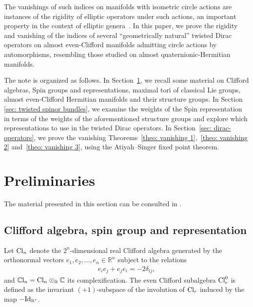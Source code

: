 \documentclass[pdftex]{sigma}
\numberwithin{equation}{section}
\begin{document}
The vanishings of such indices on manifolds with isometric circle actions are instances of the rigidity of elliptic operators under such actions,
an important property in the context of elliptic genera~\cite{BT,Dessai-rigidity,Hi-genera, HiSl,Liu, Taubes,W1, W2}. In this paper, we prove the rigidity and vanishing of the indices of several ``geometrically natural'' twisted Dirac operators on almost even-Clif\/ford manifolds admitting circle actions by automorphisms, resembling those studied on almost quaternionic-Hermitian manifolds.

The note is organized as follows. In Section~\ref{sec: preliminaries}, we recall some material on Clif\/ford algebras, Spin groups and representations, maximal tori of classical Lie groups, almost even-Clif\/ford Hermitian manifolds and their structure groups. In Section \ref{sec: twisted spinor bundles}, we examine the weights of the Spin representation in terms of the weights of the aforementioned structure groups and explore which representations to use in the twisted Dirac operators. In Section~\ref{sec: dirac-operators}, we prove the vanishing Theorems~\ref{theo: vanishing 1},~\ref{theo: vanishing 2} and~\ref{theo: vanishing 3}, using the Atiyah--Singer f\/ixed point theorem.

\section{Preliminaries}\label{sec: preliminaries}

The material presented in this section can be consulted in \cite{Arizmendi-Garcia-Herrera, Brocker-tomDieck, Friedrich}.

\subsection{Clif\/ford algebra, spin group and representation}
Let ${\rm Cl}_n$ denote the $2^n$-dimensional real Clif\/ford algebra generated by the orthonormal vectors $e_1, e_2, \dots, e_n\in \mathbb{R}^n$ subject to
the relations
\begin{gather*}e_i e_j + e_j e_i = -2\delta_{ij},\end{gather*}
and $\mathbb{C}{\rm l}_n={\rm Cl}_n\otimes_{\mathbb{R}}\mathbb{C}$ its complexif\/ication. The even Clif\/ford subalgebra ${\rm Cl}_r^0$ is def\/ined as the invariant $(+1)$-subspace of the involution of ${\rm Cl}_r$ induced by the map $-{\rm Id}_{\mathbb{R}^r}$.
\end{document}
